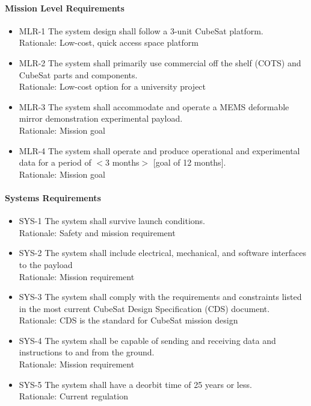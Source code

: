 \documentclass[12pt]{article}
\begin{document}
		\paragraph{Mission Level Requirements}
		\begin{itemize}
				\item MLR-1 The system design shall follow a 3-unit CubeSat platform.\\
				Rationale: Low-cost, quick access space platform
				\item MLR-2 The system shall primarily use commercial off the shelf (COTS) and CubeSat parts and components.\\
				Rationale: Low-cost option for a university project
				\item MLR-3 The system shall accommodate and operate a MEMS deformable mirror demonstration experimental payload.\\
				Rationale: Mission goal
				\item MLR-4 The system shall operate and produce operational and experimental data for a period of $<$3 months$>$ [goal of 12 months].\\
				Rationale: Mission goal
		\end{itemize}
		
		\paragraph{Systems Requirements}
		
		\begin{itemize}
			\item SYS-1 The system shall survive launch conditions.\\
Rationale: Safety and mission requirement
			\item SYS-2 The system shall include electrical, mechanical, and software interfaces to the payload\\
Rationale: Mission requirement
			\item SYS-3 The system shall comply with the requirements and constraints listed in the most current CubeSat Design Specification (CDS) document. \\
Rationale: CDS is the standard for CubeSat mission design
			\item SYS-4 The system shall be capable of sending and receiving data and instructions to and from the ground.\\
Rationale: Mission requirement
			\item SYS-5 The system shall have a deorbit time of 25 years or less. \\
Rationale: Current regulation
		\end{itemize}
\end{document}
